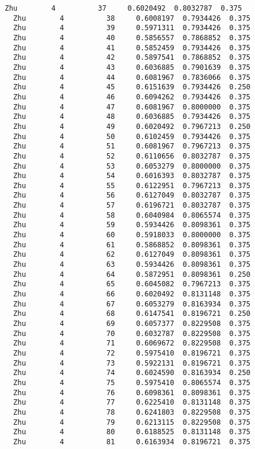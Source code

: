 \documentclass[11pt]{article}
\begin{document}
\begin{Verbatim}[commandchars=\\\{\}]
  Zhu        4          37     0.6020492  0.8032787  0.375
  Zhu        4          38     0.6008197  0.7934426  0.375
  Zhu        4          39     0.5971311  0.7934426  0.375
  Zhu        4          40     0.5856557  0.7868852  0.375
  Zhu        4          41     0.5852459  0.7934426  0.375
  Zhu        4          42     0.5897541  0.7868852  0.375
  Zhu        4          43     0.6036885  0.7901639  0.375
  Zhu        4          44     0.6081967  0.7836066  0.375
  Zhu        4          45     0.6151639  0.7934426  0.250
  Zhu        4          46     0.6094262  0.7934426  0.375
  Zhu        4          47     0.6081967  0.8000000  0.375
  Zhu        4          48     0.6036885  0.7934426  0.375
  Zhu        4          49     0.6020492  0.7967213  0.250
  Zhu        4          50     0.6102459  0.7934426  0.375
  Zhu        4          51     0.6081967  0.7967213  0.375
  Zhu        4          52     0.6110656  0.8032787  0.375
  Zhu        4          53     0.6053279  0.8000000  0.375
  Zhu        4          54     0.6016393  0.8032787  0.375
  Zhu        4          55     0.6122951  0.7967213  0.375
  Zhu        4          56     0.6127049  0.8032787  0.375
  Zhu        4          57     0.6196721  0.8032787  0.375
  Zhu        4          58     0.6040984  0.8065574  0.375
  Zhu        4          59     0.5934426  0.8098361  0.375
  Zhu        4          60     0.5918033  0.8000000  0.375
  Zhu        4          61     0.5868852  0.8098361  0.375
  Zhu        4          62     0.6127049  0.8098361  0.375
  Zhu        4          63     0.5934426  0.8098361  0.375
  Zhu        4          64     0.5872951  0.8098361  0.250
  Zhu        4          65     0.6045082  0.7967213  0.375
  Zhu        4          66     0.6020492  0.8131148  0.375
  Zhu        4          67     0.6053279  0.8163934  0.375
  Zhu        4          68     0.6147541  0.8196721  0.250
  Zhu        4          69     0.6057377  0.8229508  0.375
  Zhu        4          70     0.6032787  0.8229508  0.375
  Zhu        4          71     0.6069672  0.8229508  0.375
  Zhu        4          72     0.5975410  0.8196721  0.375
  Zhu        4          73     0.5922131  0.8196721  0.375
  Zhu        4          74     0.6024590  0.8163934  0.250
  Zhu        4          75     0.5975410  0.8065574  0.375
  Zhu        4          76     0.6098361  0.8098361  0.375
  Zhu        4          77     0.6225410  0.8131148  0.375
  Zhu        4          78     0.6241803  0.8229508  0.375
  Zhu        4          79     0.6213115  0.8229508  0.375
  Zhu        4          80     0.6188525  0.8131148  0.375
  Zhu        4          81     0.6163934  0.8196721  0.375

\end{Verbatim}
\end{document}

